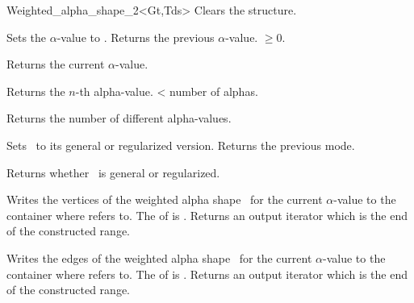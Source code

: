 \begin{ccClassTemplate} {Weighted_alpha_shape_2<Gt,Tds>}
{Clears the structure.}

{Sets the $\alpha$-value to .
 Returns the previous $\alpha$-value.
\ccPrecond {} $\geq 0$.}

{Returns the current $\alpha$-value.}

{Returns the $n$-th alpha-value.
 \ccPrecond {} < number of alphas.}

{Returns the number of different alpha-values.}

% 
% 
% 

{Sets \ccVar\ to its general or regularized version. 
Returns the previous mode.}

{Returns whether \ccVar\ is general or regularized.}

{Writes the vertices of the weighted alpha shape \ccVar\ for the current $\alpha$-value
to the container where  refers to. 
The  of  is .
Returns an output iterator which is the end of the constructed range.}

{Writes the edges 
of the weighted alpha shape \ccVar\ for the current $\alpha$-value
to the container where  refers to. 
The  of  is .
Returns an output iterator which is the end of the constructed range.}


\end{ccClassTemplate}
